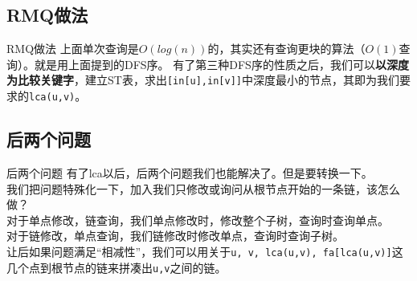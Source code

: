 \documentclass{beamer}
\begin{document}
		\subsection{RMQ做法}
			\begin{frame}{RMQ做法}
				上面单次查询是$O(log(n))$的，其实还有查询更块的算法（$O(1)$查询）。就是用上面提到的DFS序。
				有了第三种DFS序的性质之后，我们可以\textbf{以深度为比较关键字}，建立ST表，求出\texttt{[in[u],in[v]]}中深度最小的节点，其即为我们要求的\texttt{lca(u,v)}。
			\end{frame}
		\subsection{后两个问题}
			\begin{frame}{后两个问题}
				有了lca以后，后两个问题我们也能解决了。但是要转换一下。\\
				我们把问题特殊化一下，加入我们只修改或询问从根节点开始的一条链，该怎么做？\\
				对于单点修改，链查询，我们单点修改时，修改整个子树，查询时查询单点。\\
				对于链修改，单点查询，我们链修改时修改单点，查询时查询子树。\\
				让后如果问题满足“相减性”，我们可以用关于\texttt{u, v, lca(u,v), fa[lca(u,v)]}这几个点到根节点的链来拼凑出\texttt{u,v}之间的链。
			\end{frame}
\end{document}

